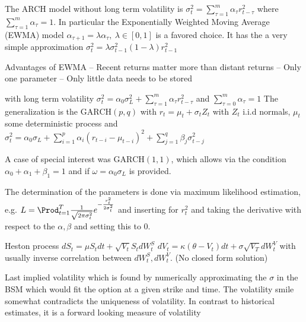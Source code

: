 The ARCH model without long term volatility is
\( \sigma^2_t = \sum_{\tau=1}^m \alpha_\tau r^2_{t - \tau} \)
where \( \sum_{\tau=1}^m \alpha_\tau = 1 \). 
In particular the Exponentially Weighted Moving Average (EWMA) model \( \alpha_{\tau+1} = \lambda \alpha_\tau,\ \lambda \in [0, 1] \)
is a favored choice. It has the a very simple approximation
\( \sigma^2_t = \lambda \sigma^2_{t-1} (1 - \lambda)r^2_{t-1} \)

Advantages of EWMA
– Recent returns matter more than distant returns
– Only one parameter
– Only little data needs to be stored

with long term volatility
\( \sigma^2_t = \alpha_0 \sigma_L^2 + \sum_{\tau=1}^m \alpha_\tau r^2_{t - \tau} \)
and \( \sum_{\tau=0}^m \alpha_\tau = 1 \)
The generalization is the \( \text{GARCH}(p,q) \) with
\( r_t = \mu_t + \sigma_t Z_t  \) with \( Z_t \) i.i.d normals, \( \mu_t \) some deterministic process and
\( \sigma^2_t = \alpha_0\sigma_L + \sum_{i=1}^p \alpha_i (r_{t-i} - \mu_{t-i})^2 + \sum_{j=1}^q \beta_j \sigma^2_{t-j} \)

A case of special interest was \( \text{GARCH}(1,1) \), which allows via the condition \( \alpha_0 + \alpha_1 + \beta_1 = 1 \)
and if \( \omega = \alpha_0 \sigma_L \) is provided.

The determination of the parameters is done via maximum likelihood estimation, e.g.
\( L = \Prod_{t=1}^T \frac{1}{\sqrt{2\pi \sigma_t^2}} e^{- \frac{r^2_t}{2\sigma^2_t}} \)
and inserting for \( r^2_t \) and taking the derivative with respect to the \( \alpha, \beta \) and setting this to \( 0 \).

Heston process
\( dS_t = \mu S_t dt + \sqrt{V_t} S_t dW_t^S \)
\( dV_t = \kappa(\theta - V_t) dt + \sigma \sqrt{V_T} dW_t^V \)
with usually inverse correlation between \( dW_t^S, dW_t^V \).
(No closed form solution)

Last implied volatility which is found by numerically approximating the \( \sigma \) in the BSM
which would fit the option at a given strike and time. The volatility smile somewhat contradicts
the uniqueness of volatility.
In contrast to historical estimates, it is a forward looking measure of volatility
